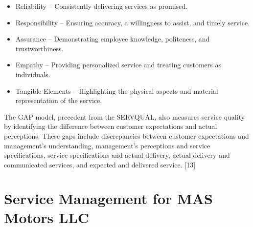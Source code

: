 \begin{itemize}
    \item Reliability – Consistently delivering services as promised.
    \item Responsibility – Ensuring accuracy, a willingness to assist, and timely service.
    \item Assurance – Demonstrating employee knowledge, politeness, and trustworthiness.
    \item Empathy – Providing personalized service and treating customers as individuals.
    \item Tangible Elements – Highlighting the physical aspects and material representation of the service.
  \end{itemize}

The GAP model, precedent from the SERVQUAL, also measures service quality by identifying the difference between customer expectations and actual perceptions. These gaps include discrepancies between customer expectations and management's understanding, management’s perceptions and service specifications, service specifications and actual delivery, actual delivery and communicated services, and expected and delivered service. [13]

\section{Service Management for MAS Motors LLC}